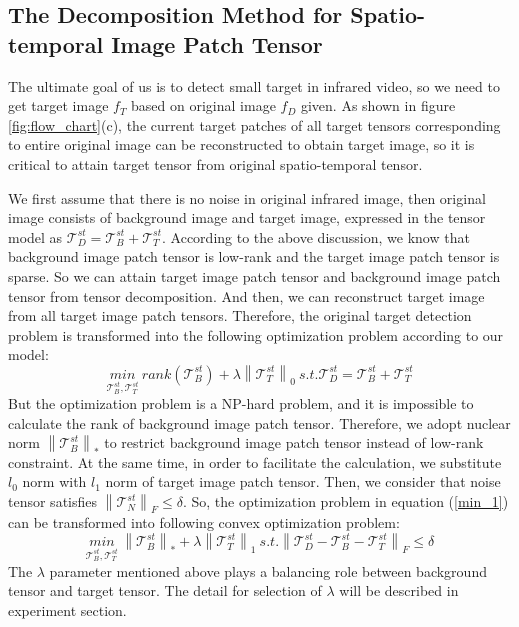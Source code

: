 \documentclass[journal]{IEEEtran}
\begin{document}
\subsection{The Decomposition Method for Spatio-temporal Image Patch Tensor}
The ultimate goal of us is to detect small target in infrared video, so we need to get target image $f_T$ based on original image $f_D$ given. As shown in figure \ref{fig:flow_chart}(c), the current target patches of all target tensors corresponding to entire original image can be reconstructed to obtain target image, so it is critical to attain target tensor from original spatio-temporal tensor.

We first assume that there is no noise in original infrared image, then original image consists of background image and target image, expressed in the tensor model as $\bm{\mathcal T}_D^{st}=\bm{\mathcal T}_B^{st}+\bm{\mathcal T}_T^{st}$. According to the above discussion, we know that background image patch tensor is low-rank and the target image patch tensor is sparse. So we can attain target image patch tensor and background image patch tensor from tensor decomposition. And then, we can reconstruct target image from all target image patch tensors. Therefore, the original target detection problem is transformed into the following optimization problem according to our model:
\begin{equation}
  \underset{\bm{\mathcal T}_B^{st},\bm{\mathcal T}_T^{st}}{min} \ rank(\bm{\mathcal T}_B^{st}) + \lambda \left \| \bm{\mathcal T}_T^{st} \right \|_0 \ s.t. \bm{\mathcal T}_D^{st}=\bm{\mathcal T}_B^{st}+\bm{\mathcal T}_T^{st}
  \label{min_1}
\end{equation}
But the optimization problem is a NP-hard problem, and it is impossible to calculate the rank of background image patch tensor. Therefore, we adopt nuclear norm $\left \| \bm{\mathcal T}_B^{st} \right \|_*$ to restrict background image patch tensor instead of low-rank constraint. At the same time, in order to facilitate the calculation, we substitute $l_0$ norm with $l_1$ norm of target image patch tensor. Then, we consider that noise tensor satisfies $\left \| \bm{\mathcal T}_N^{st}\right \|_F \leq \delta$. So, the optimization problem in equation (\ref{min_1}) can be transformed into following convex optimization problem:
\begin{equation}
  \underset{\bm{\mathcal T}_B^{st},\bm{\mathcal T}_T^{st}}{min} \ \left \| \bm{\mathcal T}_B^{st} \right \|_* + \lambda \left \| \bm{\mathcal T}_T^{st} \right \|_1 \ s.t. \left \|\bm{\mathcal T}_D^{st}-\bm{\mathcal T}_B^{st}-\bm{\mathcal T}_T^{st} \right \|_F\leq \delta
  \label{min_2}
\end{equation}
The $\lambda$ parameter mentioned above plays a balancing role between background tensor and target tensor. The detail for selection of $\lambda$ will be described in experiment section.
\end{document}
